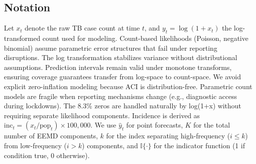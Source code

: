 \documentclass[final,3p,times,twocolumn,authoryear]{elsarticle}
\begin{document}
\subsection{Notation}
Let $x_t$ denote the raw TB case count at time $t$, and $y_t = \log(1 + x_t)$ the log-transformed count used for modeling. Count-based likelihoods (Poisson, negative binomial) assume parametric error structures that fail under reporting disruptions. The log transformation stabilizes variance without distributional assumptions. Prediction intervals remain valid under monotone transforms, ensuring coverage guarantees transfer from log-space to count-space. We avoid explicit zero-inflation modeling because ACI is distribution-free. Parametric count models are fragile when reporting mechanisms change (e.g., diagnostic access during lockdowns). The 8.3\% zeros are handled naturally by log(1+x) without requiring separate likelihood components. Incidence is derived as $\text{inc}_t = (x_t / \text{pop}_t) \times 100{,}000$. We use $\hat{y}_t$ for point forecasts, $K$ for the total number of EEMD components, $k$ for the index separating high-frequency ($i \leq k$) from low-frequency ($i > k$) components, and $\mathbb{I}\{\cdot\}$ for the indicator function (1 if condition true, 0 otherwise).
\end{document}
